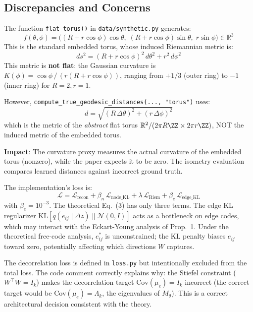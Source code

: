 \documentclass{article}
\newcommand{\RR}{\mathbb{R}}
\begin{document}
\subsection{Discrepancies and Concerns}

\begin{critical}
The function \texttt{flat\_torus()} in \texttt{data/synthetic.py} generates:
\[
    f(\theta, \phi) = \bigl((R + r\cos\phi)\cos\theta,\;
    (R + r\cos\phi)\sin\theta,\; r\sin\phi\bigr) \in \RR^3
\]
This is the standard embedded torus, whose induced Riemannian metric is:
\[
    ds^2 = (R + r\cos\phi)^2\,d\theta^2 + r^2\,d\phi^2
\]
This metric is \textbf{not flat}: the Gaussian curvature is
$K(\phi) = \cos\phi\,/\,(r(R + r\cos\phi))$, ranging from $+1/3$ (outer ring)
to $-1$ (inner ring) for $R=2, r=1$.

However, \texttt{compute\_true\_geodesic\_distances(..., "torus")} uses:
\[
    d = \sqrt{(R\,\Delta\theta)^2 + (r\,\Delta\phi)^2}
\]
which is the metric of the \emph{abstract} flat torus
$\RR^2 / (2\pi R\ZZ \times 2\pi r\ZZ)$, NOT the induced metric of the
embedded torus.

\textbf{Impact}: The curvature proxy measures the actual curvature of the
embedded torus (nonzero), while the paper expects it to be zero. The isometry
evaluation compares learned distances against incorrect ground truth.
\end{critical}

\begin{critical}
The implementation's loss is:
\[
    \mathcal{L} = \mathcal{L}_{\text{recon}}
    + \beta_n\,\mathcal{L}_{\text{node\_KL}}
    + \lambda\,\mathcal{L}_{\text{Riem}}
    + \beta_e\,\mathcal{L}_{\text{edge\_KL}}
\]
with $\beta_e = 10^{-3}$. The theoretical Eq.~(3) has only three terms.
The edge KL regularizer $\text{KL}[q(e_{ij} \mid \Delta z) \| \mathcal{N}(0,I)]$
acts as a bottleneck on edge codes, which may interact with the Eckart-Young
analysis of Prop.~1. Under the theoretical free-code analysis, $e_{ij}^*$
is unconstrained; the KL penalty biases $e_{ij}$ toward zero, potentially
affecting which directions $W$ captures.
\end{critical}

\begin{suggestion}
The decorrelation loss is defined in \texttt{loss.py} but intentionally
excluded from the total loss. The code comment correctly explains why:
the Stiefel constraint ($W^\top W = I_k$) makes the decorrelation target
$\text{Cov}(\mu_e) = I_k$ incorrect (the correct target would be
$\text{Cov}(\mu_e) = \Lambda_k$, the eigenvalues of $M_\theta$). This is a
correct architectural decision consistent with the theory.
\end{suggestion}
\end{document}
